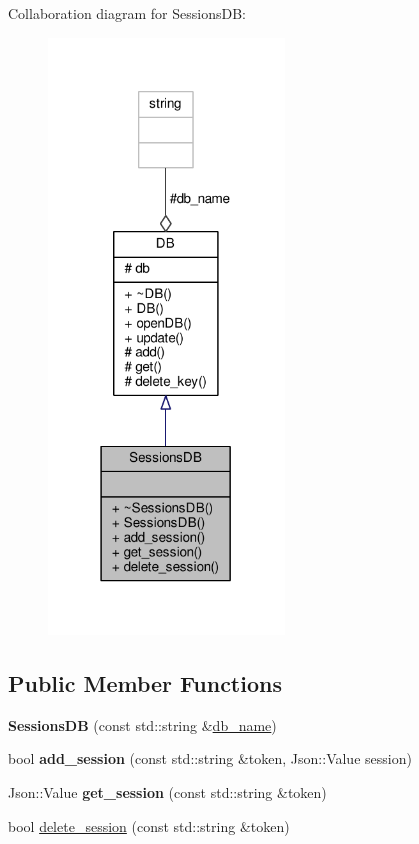 Collaboration diagram for Sessions\+DB\+:\nopagebreak
\begin{figure}[H]
\begin{center}
\leavevmode
\includegraphics[width=178pt]{d7/d85/classSessionsDB__coll__graph}
\end{center}
\end{figure}
\subsection*{Public Member Functions}
\begin{DoxyCompactItemize}
\item 
{\bfseries Sessions\+DB} (const std\+::string \&\hyperlink{classDB_a8c58fbd6650f3d5850adf699d1ee7ada}{db\+\_\+name})\hypertarget{classSessionsDB_a61fb42b17237ae1d9587083d6aea5028}{}\label{classSessionsDB_a61fb42b17237ae1d9587083d6aea5028}

\item 
bool {\bfseries add\+\_\+session} (const std\+::string \&token, Json\+::\+Value session)\hypertarget{classSessionsDB_aed6d748bd45cb1a778d598d14f9dd1cc}{}\label{classSessionsDB_aed6d748bd45cb1a778d598d14f9dd1cc}

\item 
Json\+::\+Value {\bfseries get\+\_\+session} (const std\+::string \&token)\hypertarget{classSessionsDB_a158a9a5e1458d759d1b1cc59100c5fd1}{}\label{classSessionsDB_a158a9a5e1458d759d1b1cc59100c5fd1}

\item 
bool \hyperlink{classSessionsDB_a757ce8689172d2c5a2272366b0ceefe4}{delete\+\_\+session} (const std\+::string \&token)
\end{DoxyCompactItemize}
